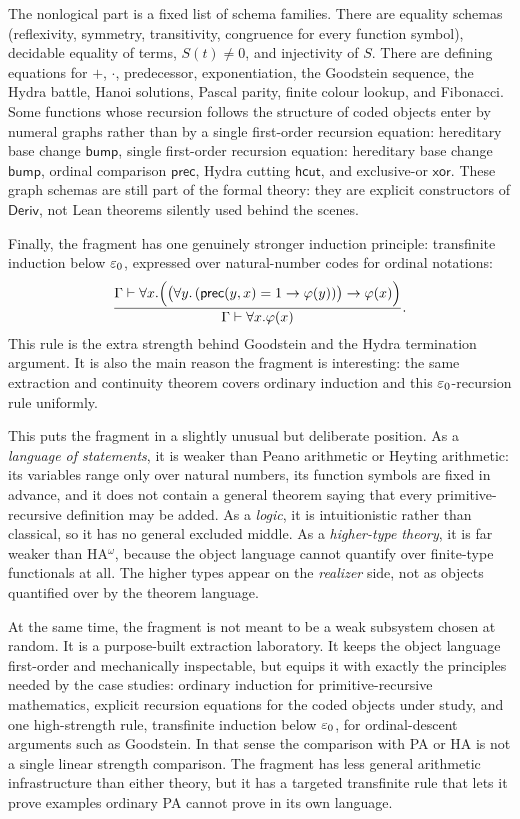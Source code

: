\documentclass[11pt]{article}
\begin{document}
The nonlogical part is a fixed list of schema families. There are equality
schemas (reflexivity, symmetry, transitivity, congruence for every function
symbol), decidable equality of terms, $S(t)\neq 0$, and injectivity of $S$.
There are defining equations for $+$, $\cdot$, predecessor, exponentiation,
the Goodstein sequence, the Hydra battle, Hanoi solutions, Pascal parity,
finite colour lookup, and Fibonacci. Some functions whose recursion follows
the structure of coded objects enter by numeral graphs rather than by a
single first-order recursion equation: hereditary base change $\mathsf{bump}$,
single first-order recursion equation: hereditary base change $\mathsf{bump}$,
ordinal comparison $\mathsf{prec}$, Hydra cutting $\mathsf{hcut}$, and
exclusive-or $\mathsf{xor}$.
These graph schemas are still part of the formal theory: they are explicit
constructors of $\mathsf{Deriv}$, not Lean theorems silently used behind the
scenes.

Finally, the fragment has one genuinely stronger induction principle:
transfinite induction below $\varepsilon_0$, expressed over natural-number codes for
ordinal notations:
\[
  \frac{
    \Gamma\vdash
    \forall x.\Bigl(
      \bigl(\forall y.\,(\mathsf{prec}(y,x)=1\to\varphi(y))\bigr)\to\varphi(x)
    \Bigr)}
  {\Gamma\vdash \forall x.\varphi(x)}.
\]
This rule is the extra strength behind Goodstein and the Hydra termination
argument. It is also the main reason the fragment is interesting: the same
extraction and continuity theorem covers ordinary induction and this
$\varepsilon_0$-recursion rule uniformly.

This puts the fragment in a slightly unusual but deliberate position. As a
\emph{language of statements}, it is weaker than Peano arithmetic or Heyting
arithmetic: its variables range only over natural numbers, its function
symbols are fixed in advance, and it does not contain a general theorem
saying that every primitive-recursive definition may be added. As a
\emph{logic}, it is intuitionistic rather than classical, so it has no
general excluded middle. As a \emph{higher-type theory}, it is far weaker
than HA$^\omega$, because the object language cannot quantify over
finite-type functionals at all. The higher types appear on the
\emph{realizer} side, not as objects quantified over by the theorem language.

At the same time, the fragment is not meant to be a weak subsystem chosen at
random. It is a purpose-built extraction laboratory. It keeps the object
language first-order and mechanically inspectable, but equips it with exactly
the principles needed by the case studies: ordinary induction for
primitive-recursive mathematics, explicit recursion equations for the coded
objects under study, and one high-strength rule, transfinite induction below
$\varepsilon_0$, for ordinal-descent arguments such as Goodstein. In that sense the
comparison with PA or HA is not a single linear strength comparison. The
fragment has less general arithmetic infrastructure than either theory, but
it has a targeted transfinite rule that lets it prove examples ordinary PA
cannot prove in its own language.
\end{document}
